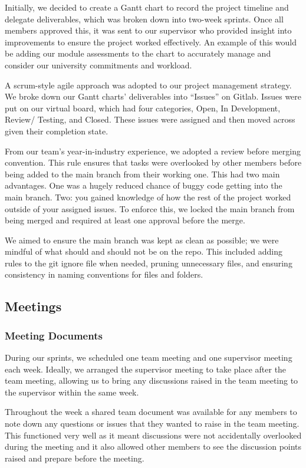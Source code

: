 \documentclass{article}
\begin{document}
Initially, we decided to create a Gantt chart to record the project timeline and delegate deliverables, which was broken down into two-week sprints. Once all members approved this, it was sent to our supervisor who provided insight into improvements to ensure the project worked effectively. An example of this would be adding our module assessments to the chart to accurately manage and consider our university commitments and workload.

A scrum-style agile approach was adopted to our project management strategy. We broke down our Gantt charts’ deliverables into “Issues” on Gitlab. Issues were put on our virtual board, which had four categories, Open, In Development, Review/ Testing, and Closed. These issues were assigned and then moved across given their completion state.

From our team’s year-in-industry experience, we adopted a review before merging convention. This rule ensures that tasks were overlooked by other members before being added to the main branch from their working one. This had two main advantages. One was a hugely reduced chance of buggy code getting into the main branch. Two: you gained knowledge of how the rest of the project worked outside of your assigned issues. To enforce this, we locked the main branch from being merged and required at least one approval before the merge.

We aimed to ensure the main branch was kept as clean as possible; we were mindful of what should and should not be on the repo. This included adding rules to the git ignore file when needed, pruning unnecessary files, and ensuring consistency in naming conventions for files and folders.

\subsection{Meetings}
\subsubsection{Meeting Documents}
During our sprints, we scheduled one team meeting and one supervisor meeting each week. Ideally, we arranged the supervisor meeting to take place after the team meeting, allowing us to bring any discussions raised in the team meeting to the supervisor within the same week.

Throughout the week a shared team document was available for any members to note down any questions or issues that they wanted to raise in the team meeting. This functioned very well as it meant discussions were not accidentally overlooked during the meeting and it also allowed other members to see the discussion points raised and prepare before the meeting.
\end{document}
